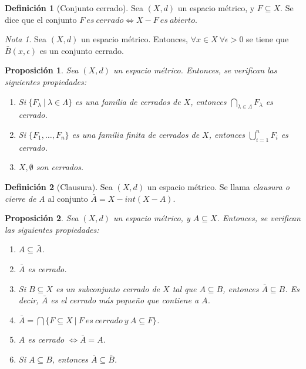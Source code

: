 \documentclass[11pt,a4paper, titlepage]{article}
\theoremstyle{plain}
\newtheorem*{nprop}{Proposición}
\theoremstyle{remark}
\newtheorem*{nota}{Nota}
\theoremstyle{definition}
\newtheorem*{ndef}{Definición}
\newenvironment{nlist}
  {\begin{enumerate}\renewcommand\labelenumi{(\emph{\roman{enumi})}}}
  {\end{enumerate}}
\begin{document}
\begin{ndef}[Conjunto cerrado]
Sea $(X,d)$ un espacio métrico, y $F\subseteq X$. Se dice que el conjunto $F\ es\ cerrado \iff X-F\ es\ abierto$.
\end{ndef}



\begin{nota}
Sea $(X,d)$ un espacio métrico. Entonces, $\forall x\in X \ \forall \epsilon > 0$ se tiene que $\bar{B}(x,\epsilon)$ es un conjunto cerrado.
\end{nota}



\begin{nprop}
Sea $(X,d)$ un espacio métrico. Entonces, se verifican las siguientes propiedades:

\begin{nlist}
\item $Si\ \{F_\lambda \ | \ \lambda \in \Lambda \}$ es una familia de cerrados de $X$, entonces $\displaystyle \bigcap_{\lambda \in \Lambda} F_\lambda$ es cerrado.

\item Si $\{F_1,\dots, F_n\}$ es una familia finita de cerrados de $X$, entonces $\displaystyle \bigcup_{i=1}^n F_i$ es cerrado.

\item $X,\emptyset$ son cerrados.
\end{nlist}
\end{nprop}



\begin{ndef}[Clausura]
Sea $(X,d)$ un espacio métrico. Se llama \textit{clausura o cierre de A} al conjunto $\bar{A} = X - int(X-A)$.
\end{ndef}



\begin{nprop}
Sea $(X,d)$ un espacio métrico, y $A\subseteq X$. Entonces, se verifican las siguientes propiedades:
\begin{nlist}
\item $A \subseteq \bar{A}$.

\item $\bar{A}$ es cerrado.

\item Si $B\subseteq X$ es un subconjunto cerrado de $X$ tal que $A\subseteq B$, entonces $\bar{A} \subseteq B$. Es decir, $\bar{A}$ es el cerrado más pequeño que contiene a $A$.

\item $\displaystyle \bar{A}  = \bigcap \{ F\subseteq X \ | \ F\ es\ cerrado\ y\ A\subseteq F \}$.

\item $A$ es cerrado $\iff \bar{A} = A$.

\item Si $A\subseteq B$, entonces $\bar{A} \subseteq \bar{B}$.
\end{nlist}
\end{nprop}
\end{document}
